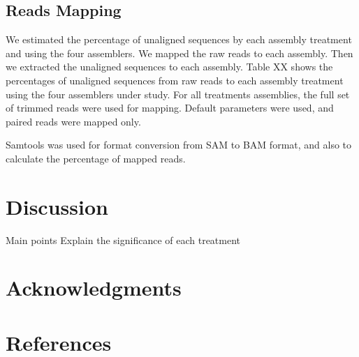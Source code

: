  
 \subsection*{Reads Mapping}

We estimated the percentage of unaligned sequences  by each assembly treatment and using the four assemblers. We mapped the raw reads to each assembly. Then we extracted the unaligned sequences to each assembly. 
Table XX shows the percentages of unaligned sequences from raw reads to each assembly treatment using the four assemblers under study.  For all treatments assemblies, the full set of trimmed reads were used for mapping. Default parameters were used, and paired reads were mapped only. %

Samtools  \cite{samtools} was used for format conversion from SAM to BAM format, and also to calculate the percentage of mapped reads.  

\section*{Discussion}
Main points
Explain the significance of each treatment
 
 
  

\section*{Acknowledgments}


\section*{References}

%
%
% 





